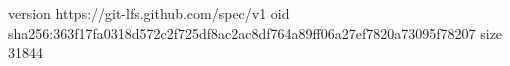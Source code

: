 version https://git-lfs.github.com/spec/v1
oid sha256:363f17fa0318d572c2f725df8ac2ac8df764a89ff06a27ef7820a73095f78207
size 31844
